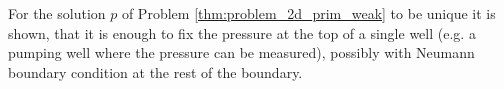 For the solution $p$ of Problem \ref{thm:problem_2d_prim_weak} to be unique it is shown,
that it is enough to fix the pressure at the top of a single well (e.g. a pumping well
where the pressure can be measured), possibly with Neumann boundary condition
at the rest of the boundary.

% 
% 
